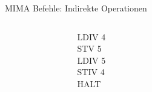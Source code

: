 \documentclass[handout]{beamer}
\begin{document}
\begin{frame}{MIMA Befehle: Indirekte Operationen}
	\bp 
	\vspace{.5cm}
	\vspace{.4cm}
	
	\begin{columns}
        \begin{column}{0.06\textwidth}
        \end{column}

		\begin{column}{0.15\textwidth}
			LDIV 4 \\ STV 5 \\ LDIV 5 \\ STIV 4 \\ HALT
		\end{column}

        \vline
        \begin{column}{0.06\textwidth}
        \end{column}
		
		\begin{column}{0.24\textwidth}
			\begin{memory}
			\end{memory}
		\end{column}
	\end{columns}
\end{frame}
\end{document}
